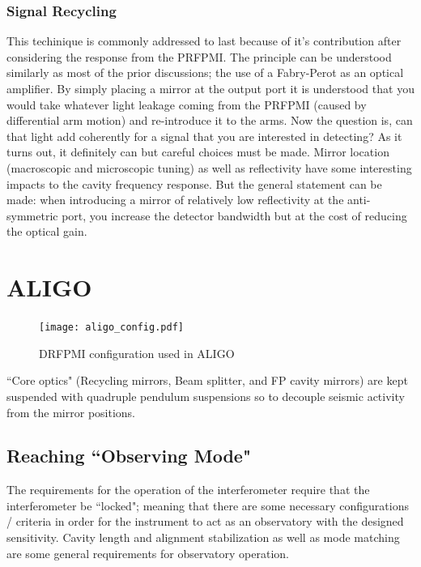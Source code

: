 \subsubsection{Signal Recycling}
This techinique is commonly addressed to last because of it's contribution after considering the response from the PRFPMI. The principle can be understood similarly as most of the prior discussions; the use of a Fabry-Perot as an optical amplifier. By simply placing a mirror at the output port it is understood that you would take whatever light leakage coming from the PRFPMI (caused by differential arm motion) and re-introduce it to the arms. Now the question is, can that light add coherently for a signal that you are interested in detecting? As it turns out, it definitely can but careful choices must be made. Mirror location (macroscopic and microscopic tuning) as well as reflectivity have some interesting impacts to the cavity frequency response. But the general statement can be made: when introducing a mirror of relatively low reflectivity at the anti-symmetric port, you increase the detector bandwidth but at the cost of reducing the optical gain.


\section{ALIGO}

\begin{figure}[H]
  \begin{center}
	  \texttt{[image: aligo\_config.pdf]}
  \end{center}
  \caption{DRFPMI configuration used in ALIGO}
  \label{fig:simple_michelson}
\end{figure}

``Core optics" (Recycling mirrors, Beam splitter, and FP cavity mirrors) are kept suspended with quadruple pendulum suspensions so to decouple seismic activity from the mirror positions.

\subsection{Reaching ``Observing Mode"}
The requirements for the operation of the interferometer require that the interferometer be  ``locked"; meaning that there are some necessary configurations / criteria in order for the instrument to act as an observatory with the designed sensitivity. Cavity length and alignment stabilization as well as mode matching are some general requirements for observatory operation.

